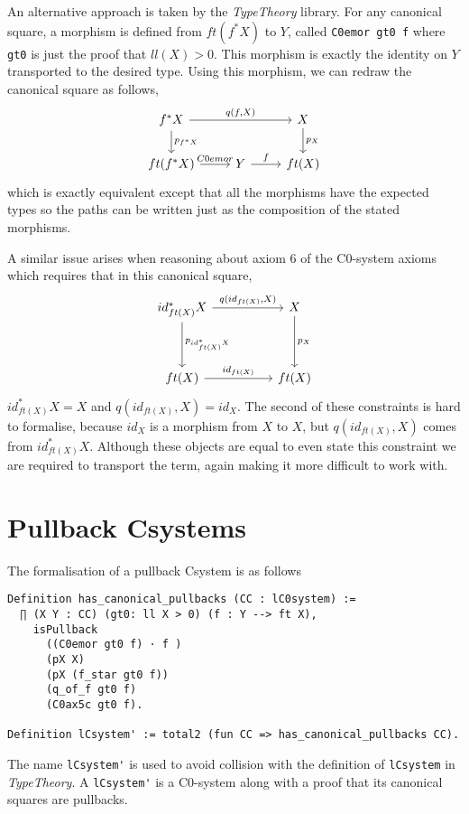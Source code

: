 An alternative approach is taken by the \textit{TypeTheory} library. For any
canonical square, a morphism is defined from $ft(f^*X)$ to $Y$, called 
\lstinline|C0emor gt0 f| where \lstinline|gt0| is just the proof that $ll(X)>0$. This
morphism is exactly the identity on $Y$ transported to the desired type. Using
this morphism, we can redraw the canonical square as follows,
\[
\begin{tikzcd}
    f^*X\ar[rr,"{q(f,X)}"]\ar[d,"p_{f^*X}"]&&X\ar[d,"p_X"] \\
    ft(f^*X)\ar[r,"C0emor"]&Y\ar[r,"f"]&ft(X)
\end{tikzcd}
\]
which is exactly equivalent except that all the morphisms have the expected
types so the paths can be written just as the composition of the stated
morphisms.

A similar issue arises when reasoning about axiom 6 of the C0-system axioms
which requires that in this canonical square,
\[
\begin{tikzcd}[sep=huge]
    {id_{ft(X)}^*X}
    \ar[r, "{q(id_{ft(X)}, X)}"]
    \ar[d, "p_{id_{ft(X)}^*X}"]&
    X\ar[d, "p_X"] \\
    ft(X)
    \ar[r, "id_{ft(X)}"]&
    ft(X)
\end{tikzcd}
\]
${id_{ft(X)}^*X} = X$ and $q(id_{ft(X)}, X) = id_X$. The second of these
constraints is hard to formalise, because $id_X$ is a morphism from $X$ to $X$,
but $q(id_{ft(X)}, X)$ comes from $id_{ft(X)}^*X$. Although these objects are
equal to even state this constraint we are required to transport the term, again
making it more difficult to work with.

\section{Pullback Csystems}
The formalisation of a pullback Csystem is as follows
\begin{lstlisting}
Definition has_canonical_pullbacks (CC : lC0system) := 
  ∏ (X Y : CC) (gt0: ll X > 0) (f : Y --> ft X), 
    isPullback 
      ((C0emor gt0 f) · f )
      (pX X) 
      (pX (f_star gt0 f))
      (q_of_f gt0 f)
      (C0ax5c gt0 f).

Definition lCsystem' := total2 (fun CC => has_canonical_pullbacks CC).
\end{lstlisting}

The name \lstinline|lCsystem'| is used to avoid collision with the definition of
\lstinline|lCsystem| in \textit{TypeTheory}. A \lstinline|lCsystem'| is a C0-system along
with a proof that its canonical squares are pullbacks.

